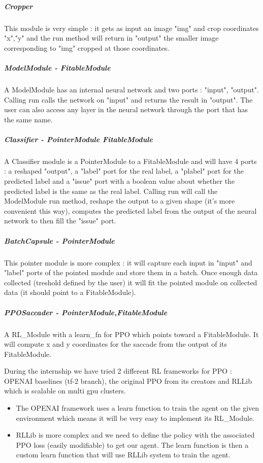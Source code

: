 \documentclass[11pt]{article}
\begin{document}
\subparagraph{Cropper}
This module is very simple : it gets as input an image "img" and crop coordinates "x","y" and the run method will return in "output" the smaller image corresponding to "img" cropped at those coordinates.

\subparagraph{ModelModule - FitableModule}
A ModelModule has an internal neural network and two ports : "input", "output". Calling run calls the network on "input" and returns the result in "output". The user can also access any layer in the neural network through the port that has the same name.

\subparagraph{Classifier - PointerModule FitableModule}
A Classifier module is a PointerModule to a FitableModule and will have 4 ports : a reshaped "output", a "label" port for the real label, a "plabel" port for the predicted label and a "issue" port with a boolean value about whether the predicted label is the same as the real label. Calling run will call the ModelModule run method, reshape the output to a given shape (it's more convenient this way), computes the predicted label from the output of the neural network to then fill the "issue" port.

\subparagraph{BatchCapsule - PointerModule}
This pointer module is more complex : it will capture each input in "input" and "label" ports of the pointed module and store them in a batch. Once enough data collected (treshold defined by the user) it will fit the pointed module on collected data (it should point to a FitableModule).

\subparagraph{PPOSaccader - PointerModule,FitableModule}
A RL\_Module with a learn\_fn for PPO which points toward a FitableModule. It will compute x and y coordinates for the saccade from the output of its FitableModule.

During the internship we have tried 2 different RL frameworks for PPO : OPENAI baselines (tf-2 branch), the original PPO from its creators and RLLib which is scalable on multi gpu clusters.
\begin{itemize}
\item The OPENAI framework uses a learn function to train the agent on the given environment which means it will be very easy to implement its RL\_Module.
\item RLLib is more complex and we need to define the policy with the associated PPO loss (easily modifiable) to get our agent. The learn function is then a custom learn function that will use RLLib system to train the agent.
\end{itemize}
\end{document}
